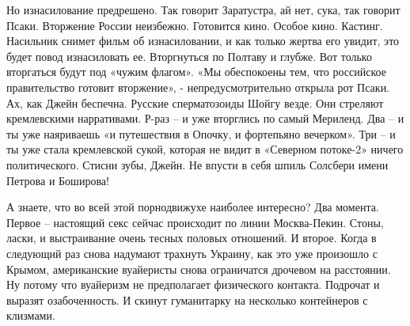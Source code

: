 Но изнасилование предрешено. Так говорит Заратустра, ай нет, сука, так говорит
Псаки. Вторжение России неизбежно. Готовится кино. Особое кино. Кастинг.
Насильник снимет фильм об изнасиловании, и как только жертва его увидит, это
будет повод изнасиловать ее. Вторгнуться по Полтаву и глубже. Вот только
вторгаться будут под «чужим флагом». «Мы обеспокоены тем, что российское
правительство готовит вторжение», - непредусмотрительно открыла рот Псаки. Ах,
как Джейн беспечна. Русские сперматозоиды Шойгу везде. Они стреляют
кремлевскими нарративами. Р-раз – и уже вторглись по самый Мериленд. Два – и ты
уже наяриваешь «и путешествия в Опочку, и фортепьяно вечерком». Три – и ты уже
стала кремлевской сукой, которая не видит в «Северном потоке-2» ничего
политического. Стисни зубы, Джейн. Не впусти в себя шпиль Солсбери имени
Петрова и Боширова!

А знаете, что во всей этой порнодвижухе наиболее интересно? Два момента. Первое
– настоящий секс сейчас происходит по линии Москва-Пекин. Стоны, ласки, и
выстраивание очень тесных половых отношений. И второе. Когда в следующий раз
снова надумают трахнуть Украину, как это уже произошло с Крымом, американские
вуайеристы снова ограничатся дрочевом на расстоянии. Ну потому что вуайеризм не
предполагает физического контакта. Подрочат и выразят озабоченность. И скинут
гуманитарку на несколько контейнеров с клизмами.

